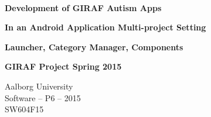 
\begin{center}

	\vspace*{\fill}

	\hrulefill\newline \\

	\begin{huge}	
		\textbf{Development of GIRAF Autism Apps}
	\end{huge}

	\vspace{0.6cm}

	\begin{Large}
		\textbf{In an Android Application Multi-project Setting}
	\end{Large}

	\vspace{0.6cm}

	\begin{large}
		\textbf{Launcher, Category Manager, Components}
	\end{large}

	\vspace{1cm}

	\begin{large} 
		\textbf{GIRAF Project Spring 2015}
	\end{large}

	\hrulefill\newline

	Aalborg University		\\
	Software -- P6 -- 2015	\\
	SW604F15				\\
    
	\vspace*{\fill}

\end{center}
\thispagestyle{empty}